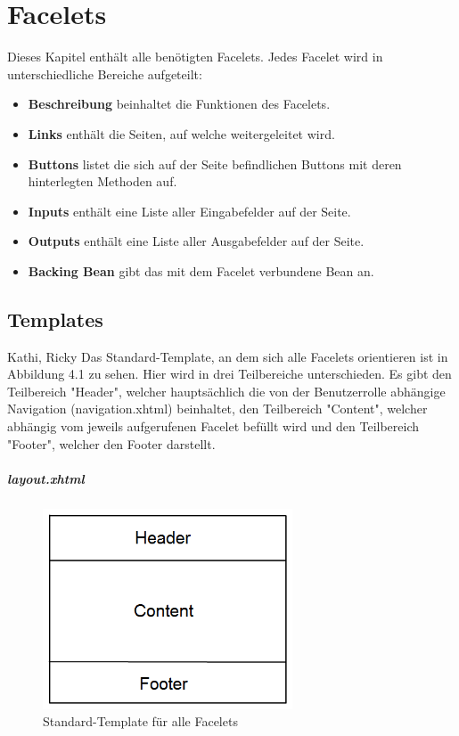 \chapter{Facelets}

	Dieses Kapitel enthält alle benötigten  Facelets. Jedes Facelet wird in unterschiedliche  Bereiche aufgeteilt:
	\begin{itemize}
		\item \textbf{Beschreibung} beinhaltet die Funktionen des Facelets.
		\item \textbf{Links} enthält die Seiten, auf welche weitergeleitet wird.
		\item \textbf{Buttons} listet die sich auf der Seite befindlichen Buttons mit deren hinterlegten Methoden auf.
		\item \textbf{Inputs} enthält eine Liste aller Eingabefelder auf der Seite.
		\item \textbf{Outputs} enthält eine Liste aller Ausgabefelder auf der Seite.
		\item \textbf{Backing Bean} gibt das mit dem Facelet verbundene Bean an.
	\end{itemize}
	
	\section{Templates}
		Kathi, Ricky
		Das Standard-Template, an dem sich alle Facelets orientieren ist in Abbildung 4.1 zu sehen. Hier wird in drei Teilbereiche unterschieden. Es gibt den Teilbereich "Header", welcher hauptsächlich die von der Benutzerrolle abhängige Navigation (navigation.xhtml) beinhaltet, den Teilbereich "Content", welcher abhängig vom jeweils aufgerufenen Facelet befüllt wird und den Teilbereich "Footer", welcher den Footer darstellt.
	
		\paragraph{layout.xhtml}
			\begin{figure}
				\centering
				\includegraphics[width=0.66\textwidth, angle=0]{Grafiken/Template.png}
	  			\caption{Standard-Template für alle Facelets}
			\end{figure}


